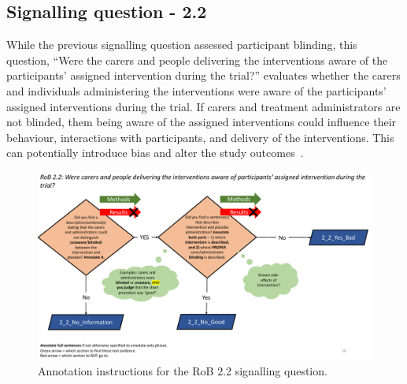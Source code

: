 \documentclass[sn-mathphys,Numbered]{sn-jnl}%
\begin{document}
\subsection*{Signalling question - 2.2}
\label{subsec:2_2}
%
While the previous signalling question assessed participant blinding, this question, ``Were the carers and people delivering the interventions aware of the participants' assigned intervention during the trial?'' evaluates whether the carers and individuals administering the interventions were aware of the participants' assigned interventions during the trial.
If carers and treatment administrators are not blinded, them being aware of the assigned interventions could influence their behaviour, interactions with participants, and delivery of the interventions.
This can potentially introduce bias and alter the study outcomes~\cite{hrobjartsson2011blinding}.


%
%
%
\begin{figure}[hbt]
    \centering
    \includegraphics[width=\textwidth]{figures/2_2.pdf}
    \caption{Annotation instructions for the RoB 2.2 signalling question.}
    \label{fig:2_2}
\end{figure}
%
%
%
\end{document}
